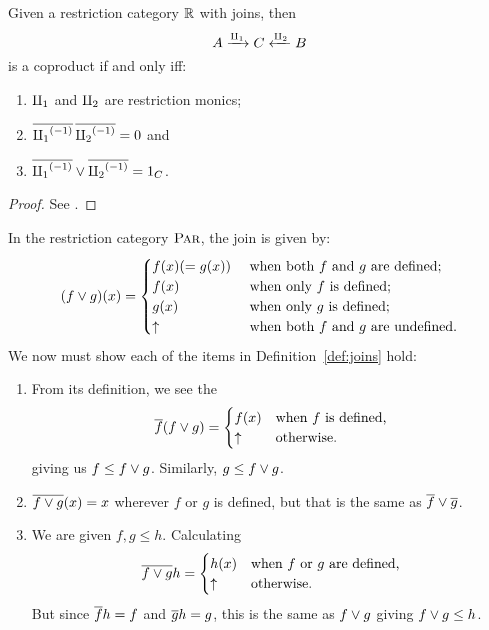 \begin{theorem}\label{lem:join_determines_coproduct}
  Given a restriction category $\mathbb{R}$ with joins, then
  \[
    A \xrightarrow{\amalg_{1}} C \xleftarrow{\amalg_{2}} B
  \]
  is a coproduct if and only iff:
  \begin{enumerate}[{(}i{)}]
    \item $\amalg_{1}$ and $\amalg_{2}$ are restriction monics;
    \item $\overline{{\amalg_{1}}^{(-1)}}\,\overline{{\amalg_{2}}^{(-1)}} = 0$ and
    \item $\overline{{\amalg_{1}}^{(-1)}} \vee \overline{{\amalg_{2}}^{(-1)}} = 1_C$.
  \end{enumerate}
\end{theorem}
\begin{proof}
  See \cite{cockett-guo2007:joinrestrictioncats}.
\end{proof}
\begin{example}\label{ex:joins_in_par}
In the restriction category $\textsc{Par}$, the join is given by:
\[(f \vee g) (x) = \begin{cases}
  f(x)( = g(x))& \text{ when both $f$ and $g$ are defined;}\\
  f(x)& \text{ when only $f$ is defined;}\\
  g(x)& \text{ when only $g$ is defined;}\\
  \uparrow & \text{ when both $f$ and $g$ are undefined.}
\end{cases}
\]
We now must show each of the items in Definition~\ref{def:joins} hold:
  \begin{enumerate}[{(}i{)}]
    \item From its definition, we see the
      \[
        \overline{f}(f\vee g) = \begin{cases}
          f(x) & \text{when $f$ is defined,}\\
          \uparrow & \text{otherwise.}
          \end{cases}
       \]
       giving us $f \le f\vee g$. Similarly, $g \le f\vee g$.
    \item $\overline{f\vee g}(x) = x$ wherever $f$ or $g$ is defined, but that is the same as $\overline{f}\vee \overline{g}$.
    \item We are given $f,g \le h$. Calculating
      \[
        \overline{f\vee g} h
          = \begin{cases}
            h(x) &\text{when $f$ or $g$ are defined,}\\
            \uparrow &\text{otherwise.}
            \end{cases}
      \]
      But since $\overline{f}h = f$ and $\overline{g}h = g$, this is the same as $f\vee g$ giving $f\vee g \le h$.

\end{enumerate}
\end{example}
